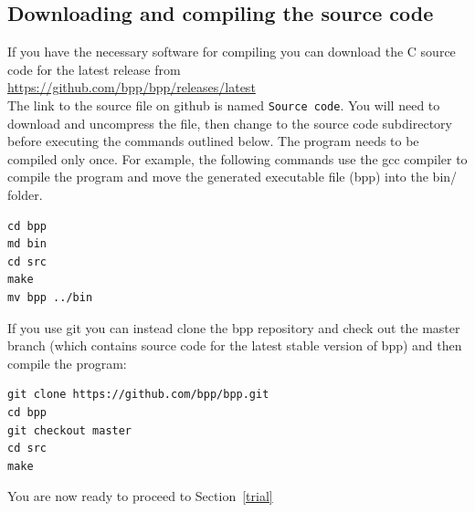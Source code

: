 \documentclass[a4paper]{book}
\numberwithin{equation}{section} \renewcommand{\baselinestretch}{0.55}
\begin{document}
\subsection{Downloading and compiling the source code}
If you have the necessary software for compiling you can download the
C source code for the latest release from
\newline \noindent \vspace{0.1pt} \\
\href{https://github.com/bpp/bpp/releases/latest}{https://github.com/bpp/bpp/releases/latest}
\newline \noindent \vspace{0.1pt} \\
The link to the source file on github is named \texttt{Source
  code}. You will need to download and uncompress the file, then
change to the source code subdirectory before executing the commands
outlined below.  The program needs to be compiled only once.  For
example, the following commands use the gcc compiler to compile the
program and move the generated executable file (bpp) into the bin/
folder.  {\color{red}
\begin{verbatim}
cd bpp
md bin
cd src
make
mv bpp ../bin
\end{verbatim}}
  \noindent
  If you use git you can instead clone the bpp repository and check
  out the master branch (which contains source code for the latest
  stable version of bpp) and then compile the program: {\color{red}
\begin{verbatim}
git clone https://github.com/bpp/bpp.git
cd bpp
git checkout master
cd src
make
\end{verbatim}}
    \noindent
    You are now ready to proceed to Section~\ref{trial}
\end{document}
